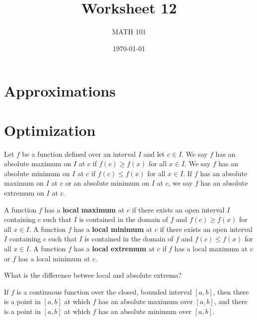 \documentclass[12pt]{amsart}
\title{ Worksheet 12}
\author{MATH 101}
\date{\today}
\begin{document}
\maketitle

\section*{Approximations}


\section*{Optimization}



\begin{definition}
	Let \( f \) be a function defined over an interval \( I \) and let \( c \in I \).
	We say \( f \) has an absolute maximum on \( I \) at \( c \) if \( f(c) \geq f(x) \) for all \( x \in I \).
	We say \( f \) has an absolute minimum on \( I \) at \( c \) if \( f(c) \leq f(x) \) for all \( x \in I \).
	If \( f \) has an absolute maximum on \( I \) at \( c \) or an absolute minimum on \( I \) at \( c \), we say \( f \) has an absolute extremum on \( I \) at \( c \).
\end{definition}

\begin{definition}
	A function \( f \) has a \textbf{local maximum} at \( c \) if there exists an open interval \( I \) containing \( c \) such that \( I \) is contained in the domain of \( f \) and \( f(c) \geq f(x) \) for all \( x \in I \). A function \( f \) has a \textbf{local minimum} at \( c \) if there exists an open interval \( I \) containing \( c \) such that \( I \) is contained in the domain of \( f \) and \( f(c) \leq f(x) \) for all \( x \in I \). A function \( f \) has a \textbf{local extremum} at \( c \) if \( f \) has a local maximum at \( c \) or \( f \) has a local minimum at \( c \).
\end{definition}

\begin{question}
	What is the difference betwee local and absolute extrema?
\end{question}

\newpage


\begin{theorem}
	If \( f \) is a continuous function over the closed, bounded interval \([a, b]\),
	then there is a point in \([a, b]\) at which \( f \) has an absolute maximum over \([a, b]\),
	and there is a point in \([a, b]\) at which \( f \) has an absolute minimum over \([a, b]\).
\end{theorem}
\end{document}
